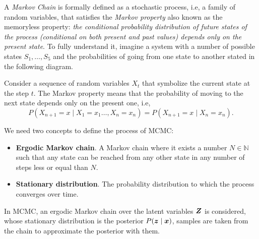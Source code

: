 A \emph{Markov Chain} is formally defined as a stochastic process, i.e, a family of random variables, that satisfies the \emph{Markov property} also known as the memoryless property: \textit{the conditional probability distribution of future states of the process (conditional on both present and past values) depends only on the present state}. To fully understand it, imagine a system with a number of possible states \(S_{1},\dots,S_{5}\) and the probabilities of going from one state to another stated in the following diagram.

\begin{center}
\end{center}

Consider a sequence of random variables \(X_{t}\) that symbolize the current state at the step \(t\). The Markov property means that the probability of moving to the next state depends only on the present one, i.e,
\[
  P(X_{n+1} = x \mid X_{1} = x_{1} \dots, X_{n} = x_{n}) = P(X_{n+1} = x \mid X_{n} = x_{n}).
\]

We need two concepts to define the process of MCMC:
\begin{itemize}
  \item \textbf{Ergodic Markov chain}. A Markov chain where it exists a number \(N \in \mathbb{N}\) such that any state can be reached from any other state in any number of steps less or equal than \(N\).
  \item \textbf{Stationary distribution}. The probability distribution to which the process converges over time.
\end{itemize}

In MCMC, an ergodic Markov chain over the latent variables \(\bm{Z}\) is considered, whose stationary distribution is the posterior \(P(\bm{z} \mid \bm{x})\), samples are taken from the chain to approximate the posterior with them.

